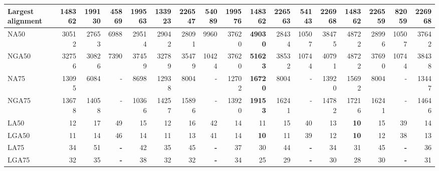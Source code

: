 \documentclass[12pt,a4paper]{article}
\begin{document}
\begin{table}[ht]
\begin{center}
\begin{tabular}{|l*{16}{|r}|}
Largest alignment & 148362 & 199130 & 45869 & 199563 & 133923 & 226547 & 54089 & 199576 & 148362 & 226563 & 54143 & {\bf 226968} & 148362 & 226559 & 82059 & {\bf 226968} \\ \hline
NA50 & 30512 & 27653 & 6988 & 29514 & 29042 & 28091 & 9960 & 37620 & {\bf 49030} & 28434 & 10507 & 38475 & 48722 & 28996 & 10507 & 37642 \\ \hline
NGA50 & 32756 & 30826 & 7390 & 37459 & 32789 & 35479 & 10424 & 37620 & {\bf 51623} & 38532 & 10744 & 40791 & 48722 & 37690 & 10744 & 38438 \\ \hline
NA75 & 13095 & 6084 & - & 8698 & 12938 & 8004 & - & 12702 & {\bf 16720} & 8004 & - & 13920 & 15692 & 8004 & - & 13447 \\ \hline
NGA75 & 13678 & 14058 & - & 10366 & 14257 & 15896 & - & 13920 & {\bf 19153} & 16241 & - & 14782 & 17216 & 16241 & - & 14646 \\ \hline
LA50 & 12 & 17 & 49 & 15 & 12 & 16 & 42 & 14 & 11 & 15 & 40 & 13 & {\bf 10} & 15 & 39 & 14 \\ \hline
LGA50 & 11 & 14 & 46 & 14 & 11 & 13 & 41 & 14 & {\bf 10} & 11 & 39 & 12 & {\bf 10} & 12 & 38 & 13 \\ \hline
LA75 & 34 & 51 & {\bf -} & 42 & 35 & 45 & {\bf -} & 37 & 30 & 44 & {\bf -} & 34 & 31 & 45 & {\bf -} & 36 \\ \hline
LGA75 & 32 & 35 & {\bf -} & 38 & 32 & 32 & {\bf -} & 34 & 25 & 29 & {\bf -} & 30 & 28 & 30 & {\bf -} & 31 \\ \hline
\end{tabular}
\end{center}
\end{table}
\end{document}
